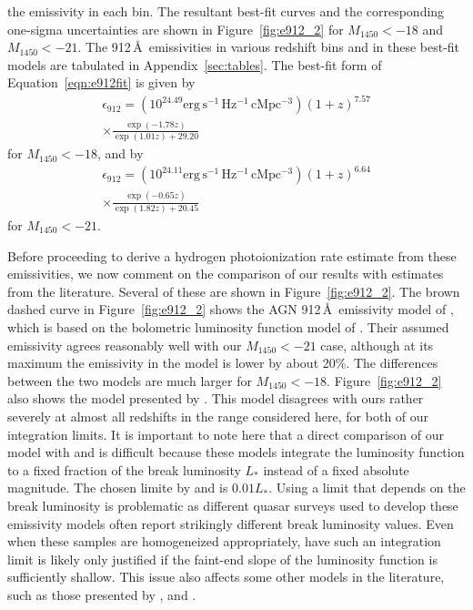 \documentclass[fleqn,usenatbib]{mnras}
\begin{document}
the emissivity in each bin.  The resultant best-fit curves and the
corresponding one-sigma uncertainties are shown in
Figure~\ref{fig:e912_2} for $M_{1450}<-18$ and $M_{1450}<-21$.  The
912\,\AA\ emissivities in various redshift bins and in these best-fit
models are tabulated in Appendix~\ref{sec:tables}.  The best-fit
form of Equation~\ref{eqn:e912fit} is given by
\begin{multline}
  \epsilon_{912}=(10^{24.49}\mathrm{erg\, s^{-1}\, Hz^{-1}\, cMpc^{-3}})(1+z)^{7.57}\\\times\frac{\exp(-1.78z)}{\exp(1.01z)+29.20}
\end{multline}
for $M_{1450}<-18$, and by 
\begin{multline}
  \epsilon_{912}=(10^{24.11}\mathrm{erg\, s^{-1}\, Hz^{-1}\, cMpc^{-3}})(1+z)^{6.64}\\\times\frac{\exp(-0.65z)}{\exp(1.82z)+20.45}
\end{multline}
for $M_{1450}<-21$.

Before proceeding to derive a hydrogen photoionization rate estimate
from these emissivities, we now comment on the comparison of our
results with estimates from the literature.  Several of these are
shown in Figure~\ref{fig:e912_2}.  The brown dashed curve in
Figure~\ref{fig:e912_2} shows the AGN 912\,\AA\ emissivity model of
\citet{2012ApJ...746..125H}, which is based on the bolometric
luminosity function model of \citet{2007ApJ...654..731H}.  Their
assumed emissivity agrees reasonably well with our $M_{1450}<-21$
case, although at its maximum the emissivity in the
\citet{2007ApJ...654..731H} model is lower by about 20\%.  The
differences between the two models are much larger for $M_{1450}<-18$.
Figure~\ref{fig:e912_2} also shows the model presented by
\citet{2015ApJ...813L...8M}.  This model disagrees with ours rather
severely at almost all redshifts in the range considered here, for
both of our integration limits.  It is important to note here that a
direct comparison of our model with \citet{2012ApJ...746..125H} and
\citet{2015ApJ...813L...8M} is difficult because these models
integrate the luminosity function to a fixed fraction of the break
luminosity $L_*$ instead of a fixed absolute magnitude.  The chosen
limite by \citet{2012ApJ...746..125H} and \citet{2015ApJ...813L...8M}
is $0.01L_*$.  Using a limit that depends on the break luminosity is
problematic as different quasar surveys used to develop these
emissivity models often report strikingly different break luminosity
values.  Even when these samples are homogeneized appropriately, have
such an integration limit is likely only justified if the faint-end
slope of the luminosity function is sufficiently shallow.  This issue
also affects some other models in the literature, such as those
presented by \citet{2015AA...578A..83G}, \citet{2015MNRAS.451L..30K}
and \citet{2018arXiv180104931P}.
\end{document}

